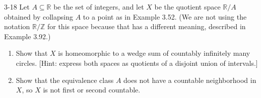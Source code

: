 \begin{problem}{3-18}
Let $A\subseteq \mathbb{R}$ be the set of integers, and let $X$ be the quotient space $\mathbb{R}/A$ obtained by collapsing $A$ to a point as in Example 3.52. (We are not using the notation $\mathbb{R}/\mathbb{Z}$ for this space because that has a different meaning, described in Example 3.92.)
\begin{enumerate}[label={(\alph*)}]
	\item Show that $X$ is homeomorphic to a wedge sum of countably infinitely many circles. [Hint: express both spaces as quotients of a disjoint union
			      of intervals.]
	\item Show that the equivalence class $A$ does not have a countable neighborhood in $X$, so $X$ is not first or second countable.
\end{enumerate}
\end{problem}

